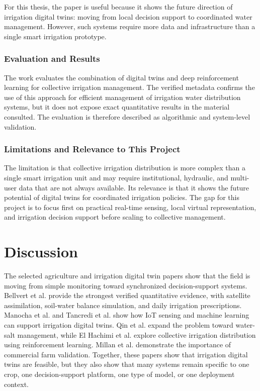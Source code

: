 For this thesis, the paper is useful because it shows the future direction of irrigation digital twins: moving from local decision support to coordinated water management. However, such systems require more data and infrastructure than a single smart irrigation prototype.

\subsubsection{Evaluation and Results}

The work evaluates the combination of digital twins and deep reinforcement learning for collective irrigation management. The verified metadata confirms the use of this approach for efficient management of irrigation water distribution systems, but it does not expose exact quantitative results in the material consulted. The evaluation is therefore described as algorithmic and system-level validation.

\subsubsection{Limitations and Relevance to This Project}

The limitation is that collective irrigation distribution is more complex than a single smart irrigation unit and may require institutional, hydraulic, and multi-user data that are not always available. Its relevance is that it shows the future potential of digital twins for coordinated irrigation policies. The gap for this project is to focus first on practical real-time sensing, local virtual representation, and irrigation decision support before scaling to collective management.

\section{Discussion}

The selected agriculture and irrigation digital twin papers show that the field is moving from simple monitoring toward synchronized decision-support systems. Bellvert et al. provide the strongest verified quantitative evidence, with satellite assimilation, soil-water balance simulation, and daily irrigation prescriptions. Manocha et al. and Tancredi et al. show how IoT sensing and machine learning can support irrigation digital twins. Qin et al. expand the problem toward water-salt management, while El Hachimi et al. explore collective irrigation distribution using reinforcement learning. Millan et al. demonstrate the importance of commercial farm validation. Together, these papers show that irrigation digital twins are feasible, but they also show that many systems remain specific to one crop, one decision-support platform, one type of model, or one deployment context.


